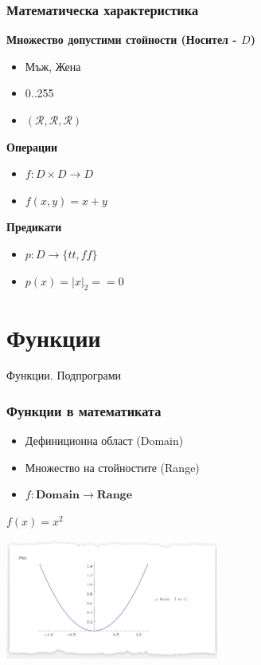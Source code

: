 \documentclass{beamer}
\begin{document}
\begin{frame}[fragile]
\frametitle{Математическа характеристика}


\textbf{Множество допустими стойности (Носител - $D$)}

\pause

\begin{itemize}
  \item Мъж, Жена
  \item 0..255
  \item $(\mathcal{R},\mathcal{R},\mathcal{R})$
\end{itemize}

\pause

\textbf{Операции}

\begin{itemize}
  \item $f:D\times D \rightarrow D$
  \item $f(x,y)=x+y$
\end{itemize}


\pause

\textbf{Предикати}

\begin{itemize}
  \item $p:D \rightarrow \{tt,ff\}$
  \item $p(x)=|x|_2==0$
\end{itemize}


\end{frame}


\section{Функции}

\begin{frame}
\centerline{Функции. Подпрограми}
\end{frame}

\begin{frame}[fragile]
\frametitle{Функции в математиката}


\begin{itemize}
  \item Дефиниционна област (Domain)
  \item Множество на стойностите (Range)
  \item $f:\mathbf{Domain} \rightarrow \mathbf{Range}$
\end{itemize}


\vspace{0.2cm}
$f(x) = x^2$

\begin{center}
\includegraphics[width=7cm]{images/square}
\end{center}


\end{frame}
\end{document}
